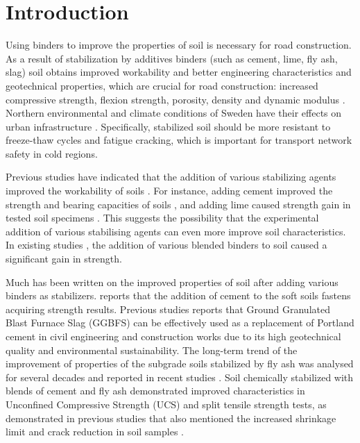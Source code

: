 \documentclass[constrmater,article,submit,pdftex,moreauthors]{Definitions/mdpi}
\begin{document}
\section{Introduction}

Using binders to improve the properties of soil is necessary for road construction. As a result of stabilization by additives binders (such as cement, lime, fly ash, slag) soil obtains improved workability and better engineering characteristics and geotechnical properties, which are crucial for road construction: increased compressive strength,  flexion strength, porosity, density and dynamic modulus \cite{Carasca}. Northern environmental and climate conditions of Sweden have their effects on urban infrastructure \citep{Amorim,Gustavsson}. Specifically, stabilized soil should be more resistant to freeze-thaw cycles and fatigue cracking, which is important for transport network safety in cold regions. 

Previous studies have indicated that the addition of various stabilizing agents improved the workability of soils \citep{Etim,Fasihnikoutalab,Kogbara,Lindh2022b,Mavroulidou}. For instance, adding cement improved the strength and bearing capacities of soils \cite{Ekpo}, and adding lime caused strength gain in tested soil specimens \cite{Frempong}. This suggests the possibility that the experimental addition of various stabilising agents can even more improve soil characteristics. In existing studies \citep{Abbey,AlHdabi,ma15217798,Jafer,Lietal2021,Wangetal2015}, the addition of various blended binders to soil caused a significant gain in strength.

Much has been written on the improved properties of soil after adding various binders as stabilizers. \cite{Consoli} reports that the addition of cement to the soft soils fastens acquiring strength results. Previous studies reports \cite{Higgins,electronics11223726} that Ground Granulated Blast Furnace Slag (GGBFS) can be effectively used as a replacement of Portland cement in civil engineering and construction works due to its high geotechnical quality and environmental sustainability. The long-term trend of the improvement of properties of the subgrade soils stabilized by fly ash was analysed for several decades and reported in recent studies \cite{Parsons}. Soil chemically stabilized with blends of cement and fly ash demonstrated improved characteristics in Unconfined Compressive Strength (UCS) and split tensile strength tests, as demonstrated in previous studies that also mentioned the increased shrinkage limit and crack reduction in soil samples \cite{Olgun}.
\end{document}
